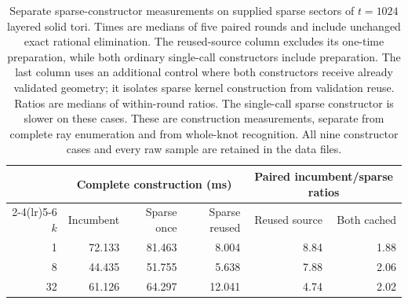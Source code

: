 \begin{table}[htbp]
\centering
\small
\setlength{\tabcolsep}{4pt}
\begin{tabular}{r rrr rr}
\toprule
& \multicolumn{3}{c}{Complete construction (ms)}
& \multicolumn{2}{c}{Paired incumbent/sparse ratios} \\
\cmidrule(lr){2-4}\cmidrule(lr){5-6}
$k$ & Incumbent & Sparse once & Sparse reused & Reused source & Both cached \\
\midrule
1 & 72.133 & 81.463 & 8.004 & 8.84 & 1.88 \\
8 & 44.435 & 51.755 & 5.638 & 7.88 & 2.06 \\
32 & 61.126 & 64.297 & 12.041 & 4.74 & 2.02 \\
\bottomrule
\end{tabular}
\caption{Separate sparse-constructor measurements on supplied sparse sectors
of $t=1024$ layered solid tori. Times are medians of five paired rounds and
include unchanged exact rational elimination. The reused-source column
excludes its one-time preparation, while both ordinary single-call
constructors include preparation. The last column uses an additional control
where both constructors receive already validated geometry; it isolates
sparse kernel construction from validation reuse. Ratios are medians of
within-round ratios. The single-call sparse constructor is slower on these
cases. These are construction measurements, separate from complete ray
enumeration and from whole-knot recognition. All nine constructor cases
and every raw sample are retained in the data files.}
\label{tab:planar-sparse-source-control}
\end{table}
